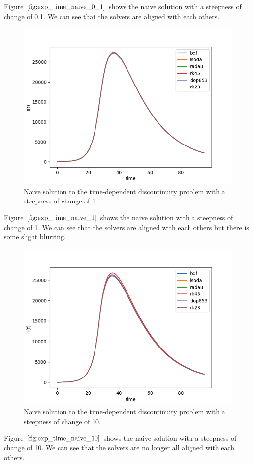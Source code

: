 Figure $\ref{fig:exp_time_naive_0_1}$ shows the naive solution with a steepness of change of 0.1. We can see that the solvers are aligned with each others.

\begin{figure}[H]
\centering
\includegraphics[width=0.7\linewidth]{./figures/exp_time_naive_1}
\caption{Naive solution to the time-dependent discontinuity problem with a steepness of change of 1.}
\label{fig:exp_time_naive_1}
\end{figure}

Figure $\ref{fig:exp_time_naive_1}$ shows the naive solution with a steepness of change of 1. We can see that the solvers are aligned with each others but there is some slight blurring.

\begin{figure}[H]
\centering
\includegraphics[width=0.7\linewidth]{./figures/exp_time_naive_10}
\caption{Naive solution to the time-dependent discontinuity problem with a steepness of change of 10.}
\label{fig:exp_time_naive_10}
\end{figure}

Figure $\ref{fig:exp_time_naive_10}$ shows the naive solution with a steepness of change of 10. We can see that the solvers are no longer all aligned with each others.

